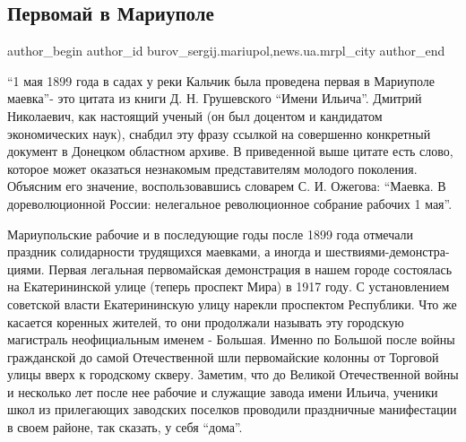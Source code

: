  
 
 
 
 
 
\subsection{Первомай в Мариуполе}
\label{sec:30_04_2017.stz.news.ua.mrpl_city.1.pervomaj_v_mariupole}
 
\ifcmt
 author_begin
   author_id burov_sergij.mariupol,news.ua.mrpl_city
 author_end
\fi

\enquote{1 мая 1899 года в садах у реки Кальчик была проведена первая в Мариуполе
маевка}- это цитата из книги Д. Н. Грушевского \enquote{Имени Ильича}. Дмитрий
Николаевич, как настоящий ученый (он был доцентом и кандидатом экономических
наук), снабдил эту фразу ссылкой на совершенно конкретный документ в Донецком
областном архиве. В приведенной выше цитате есть слово, которое может
оказаться не­знакомым представителям молодого поколения. Объясним его значение,
воспользовавшись словарем С. И. Ожегова: \enquote{Маевка. В дореволюционной России:
нелегальное революционное собрание рабочих 1 мая}.


Мариупольские рабочие и в последующие годы после 1899 года отмечали праздник
солидарности трудящихся маевками, а иногда и шествиями-демонстра\hyp{}циями. Первая
легальная первомайская демонстрация в нашем городе состоялась на Екатерининской
улице (теперь про­спект Мира) в 1917 году. С установлением советской власти
Екатерининскую улицу нарекли проспектом Республики. Что же касается коренных
жителей, то они продолжали называть эту городскую магистраль неофициальным
именем - Большая. Именно по Большой после войны гражданской до самой
Отечественной шли первомайские колонны от Торговой улицы вверх к городскому
скверу. Заметим, что до Великой Отечественной войны и не­сколько лет после нее
рабочие и служащие завода имени Ильича, ученики школ из прилегающих заводских
поселков проводили праздничные манифестации в своем районе, так сказать, у себя
\enquote{дома}.

